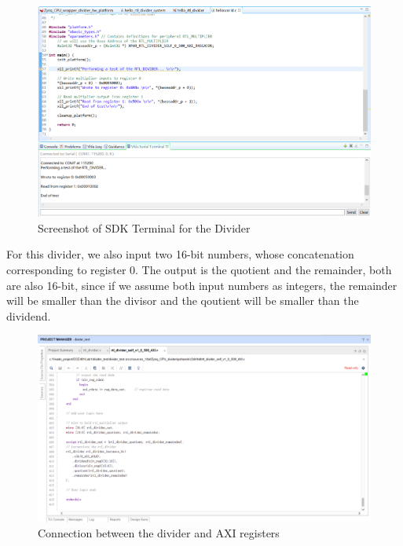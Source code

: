 \documentclass[a4paper]{article}
\begin{document}
\begin{figure}[H]
    \centering
    \includegraphics[width=14cm]{10_new.png}
    \caption{Screenshot of SDK Terminal for the Divider}
    \label{fig:10}
\end{figure}
For this divider, we also input two 16-bit numbers, whose concatenation corresponding to register 0. The output is the quotient and the remainder, both are also 16-bit, since if we assume both input numbers as integers, the remainder will be smaller than the divisor and the qoutient will be smaller than the dividend.
\begin{figure}[H]
    \centering
    \includegraphics[width=14cm]{11}
    \caption{Connection between the divider and AXI registers}
    \label{fig:11}
\end{figure}
\end{document}
